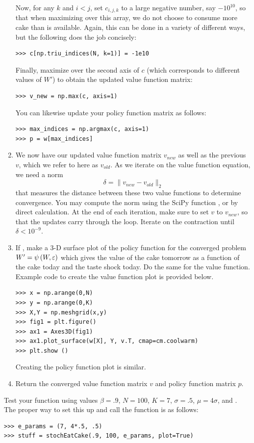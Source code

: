 \begin{problem}
\begin{enumerate}
Now, for any $k$ and $i < j$, set $c_{i,j,k}$ to a large negative number, say $-10^{10}$,
so that when maximizing over this array, we do not choose to consume more cake than is available.
Again, this can be done in a variety of different ways, but the following does the job concisely:
\begin{lstlisting}
>>> c[np.triu_indices(N, k=1)] = -1e10
\end{lstlisting}

Finally, maximize over the second axis of $c$ (which corresponds to different values of $W'$)
to obtain the updated value function matrix:
\begin{lstlisting}
>>> v_new = np.max(c, axis=1)
\end{lstlisting}
You can likewise update your policy function matrix as follows:
\begin{lstlisting}
>>> max_indices = np.argmax(c, axis=1)
>>> p = w[max_indices]
\end{lstlisting}

\item We now have our updated value function matrix $v_{new}$ as well as the
previous $v$, which we refer to here as $v_{old}$. As we iterate on the value function equation, we need a norm
\begin{equation*}
\delta = \|v_{new} - v_{old}\|_2
\end{equation*}
that measures the distance between these two value functions to determine convergence.
You may compute the norm using the SciPy function , or by direct calculation.
At the end of each iteration, make sure to set $v$ to $v_{new}$, so that the updates carry through the
loop.
Iterate on the contraction until $\delta < 10^{-9}$.

\item If , make a 3-D surface plot of the policy function for the converged problem
$W' = \psi\left(W,\varepsilon\right)$ which gives the value of the cake tomorrow as a
function of the cake today  and the taste shock today.  Do the same for the value function.
Example code to create the value function plot is provided below.
\begin{lstlisting}
>>> x = np.arange(0,N)
>>> y = np.arange(0,K)
>>> X,Y = np.meshgrid(x,y)
>>> fig1 = plt.figure()
>>> ax1 = Axes3D(fig1)
>>> ax1.plot_surface(w[X], Y, v.T, cmap=cm.coolwarm)
>>> plt.show ()
\end{lstlisting}
Creating the policy function plot is similar.

\item Return the converged value function matrix $v$ and policy function matrix $p$.


\end{enumerate}
Test your function using values $\beta = .9$, $N = 100$, $K = 7$, $\sigma = .5$, $\mu = 4\sigma$,
and .
The proper way to set this up and call the function is as follows:
\begin{lstlisting}
>>> e_params = (7, 4*.5, .5)
>>> stuff = stochEatCake(.9, 100, e_params, plot=True)
\end{lstlisting}
\end{problem}

